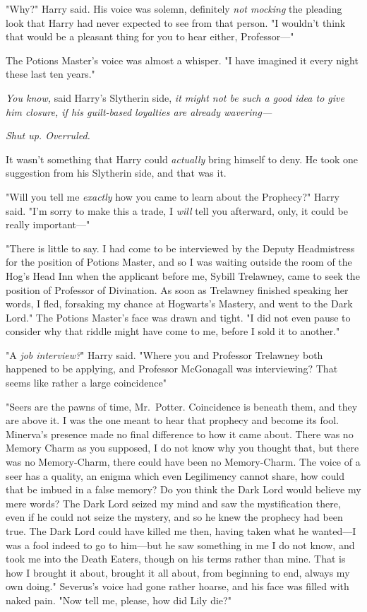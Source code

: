 "Why?" Harry said. His voice was solemn, definitely \emph{not mocking} the
pleading look that Harry had never expected to see from that person. "I
wouldn't think that would be a pleasant thing for you to hear either,
Professor\mbox{---}"

The Potions Master's voice was almost a whisper. "I have imagined it every
night these last ten years."

\emph{You know,} said Harry's Slytherin side, \emph{it might not be such a good
idea to give him closure, if his guilt-based loyalties are already wavering---}

\emph{Shut up. Overruled.}

It wasn't something that Harry could \emph{actually} bring himself to deny. He
took one suggestion from his Slytherin side, and that was it.

"Will you tell me \emph{exactly} how you came to learn about the Prophecy?"
Harry said. "I'm sorry to make this a trade, I \emph{will} tell you afterward,
only, it could be really important\mbox{---}"

"There is little to say. I had come to be interviewed by the Deputy
Headmistress for the position of Potions Master, and so I was waiting outside
the room of the Hog's Head Inn when the applicant before me, Sybill Trelawney,
came to seek the position of Professor of Divination. As soon as Trelawney
finished speaking her words, I fled, forsaking my chance at Hogwarts's Mastery,
and went to the Dark Lord." The Potions Master's face was drawn and tight. "I
did not even pause to consider why that riddle might have come to me, before I
sold it to another."

"A \emph{job interview?}" Harry said. "Where you and Professor Trelawney both
happened to be applying, and Professor McGonagall was interviewing? That
seems{\el} like rather a large coincidence{\el}"

"Seers are the pawns of time, Mr.~Potter. Coincidence is beneath them, and they
are above it. I was the one meant to hear that prophecy and become its fool.
Minerva's presence made no final difference to how it came about. There was no
Memory Charm as you supposed, I do not know why you thought that, but there was
no Memory-Charm, there could have been no Memory-Charm. The voice of a seer has
a quality, an enigma which even Legilimency cannot share, how could that be
imbued in a false memory? Do you think the Dark Lord would believe my mere
words? The Dark Lord seized my mind and saw the mystification there, even if he
could not seize the mystery, and so he knew the prophecy had been true. The
Dark Lord could have killed me then, having taken what he wanted---I was a fool
indeed to go to him---but he saw something in me I do not know, and took me
into the Death Eaters, though on his terms rather than mine. That is how I
brought it about, brought it all about, from beginning to end, always my own
doing." Severus's voice had gone rather hoarse, and his face was filled with
naked pain. "Now tell me, please, how did Lily die?"


